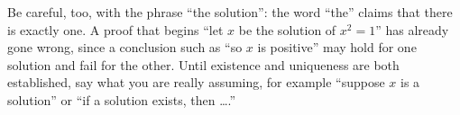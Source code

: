 Be careful, too, with the phrase ``the solution'': the word ``the'' claims that there is exactly one. A proof that begins ``let $x$ be the solution of $x^2=1$'' has already gone wrong, since a conclusion such as ``so $x$ is positive'' may hold for one solution and fail for the other. Until existence and uniqueness are both established, say what you are really assuming, for example ``suppose $x$ is a solution'' or ``if a solution exists, then \ldots.''

